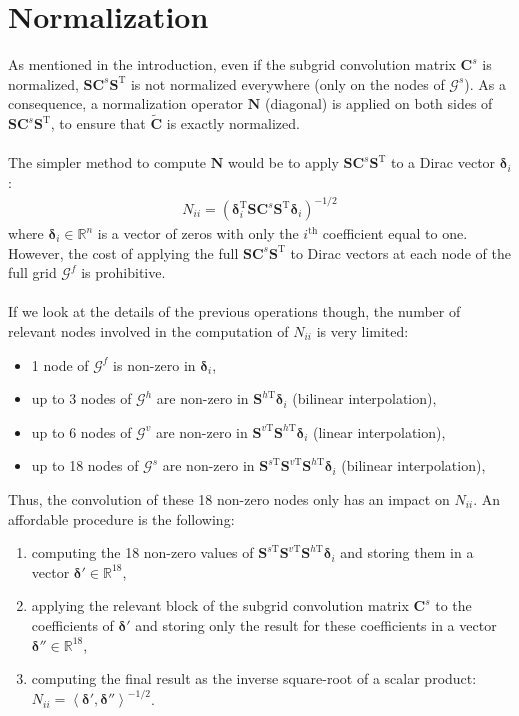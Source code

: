 \documentclass[12pt]{scrartcl}
\begin{document}
\section{Normalization}
As mentioned in the introduction, even if the subgrid convolution matrix $\mathbf{C}^s$ is normalized, $\mathbf{S} \mathbf{C}^s \mathbf{S}^\mathrm{T}$ is not normalized everywhere (only on the nodes of $\mathcal{G}^s$). As a consequence, a normalization operator $\mathbf{N}$ (diagonal) is applied on both sides of $\mathbf{S} \mathbf{C}^s \mathbf{S}^\mathrm{T}$, to ensure that $\widetilde{\mathbf{C}}$ is exactly normalized.\\
$  $\\
The simpler method to compute $\mathbf{N}$ would be to apply $\mathbf{S} \mathbf{C}^s \mathbf{S}^\mathrm{T}$ to a Dirac vector $\boldsymbol{\delta}_i$:
\begin{align}
N_{ii} = \left(\boldsymbol{\delta}_i^\mathrm{T} \mathbf{S} \mathbf{C}^s \mathbf{S}^\mathrm{T} \boldsymbol{\delta}_i\right)^{-1/2}
\end{align}
where $\boldsymbol{\delta}_i \in \mathbb{R}^n$ is a vector of zeros with only the $i^\text{th}$ coefficient equal to one. However, the cost of applying the full $\mathbf{S} \mathbf{C}^s \mathbf{S}^\mathrm{T}$ to Dirac vectors at each node of the full grid $\mathcal{G}^f$ is prohibitive.\\
$  $\\
If we look at the details of the previous operations though, the number of relevant nodes involved in the computation of $N_{ii}$ is very limited:
\begin{itemize}
\item 1 node of $\mathcal{G}^f$ is non-zero in $\boldsymbol{\delta}_i$,
\item up to 3 nodes of $\mathcal{G}^h$ are non-zero in $\mathbf{S}^{h\textrm{T}} \boldsymbol{\delta}_i$ (bilinear interpolation),
\item up to 6 nodes of $\mathcal{G}^v$ are non-zero in $\mathbf{S}^{v\textrm{T}} \mathbf{S}^{h\textrm{T}} \boldsymbol{\delta}_i$ (linear interpolation),
\item up to 18 nodes of $\mathcal{G}^s$ are non-zero in $\mathbf{S}^{s\textrm{T}} \mathbf{S}^{v\textrm{T}} \mathbf{S}^{h\textrm{T}} \boldsymbol{\delta}_i$ (bilinear interpolation),
\end{itemize}
Thus, the convolution of these 18 non-zero nodes only has an impact on $N_{ii}$. An affordable procedure is the following:
\begin{enumerate}
\item computing the 18 non-zero values of $\mathbf{S}^{s\textrm{T}} \mathbf{S}^{v\textrm{T}} \mathbf{S}^{h\textrm{T}} \boldsymbol{\delta}_i$ and storing them in a vector $\boldsymbol{\delta}' \in \mathbb{R}^{18}$,
\item applying the relevant block of the subgrid convolution matrix $\mathbf{C}^s$ to the coefficients of $\boldsymbol{\delta}'$ and storing only the result for these coefficients in a vector $\boldsymbol{\delta}'' \in \mathbb{R}^{18}$,
\item computing the final result as the inverse square-root of a scalar product: $N_{ii} = \left\langle \boldsymbol{\delta}',\boldsymbol{\delta}''\right\rangle^{-1/2}$.
\end{enumerate}
\end{document}
